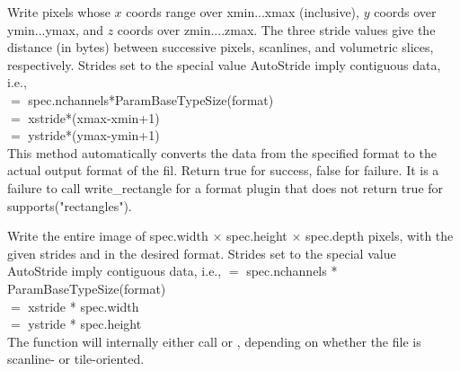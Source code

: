 \apiend


Write pixels whose $x$ coords range over {\kw xmin}...{\kw xmax} (inclusive), $y$
coords over {\kw ymin}...{\kw ymax}, and $z$ coords over {\kw
  zmin}....{\kw zmax}.  The
three stride values give the distance (in bytes) between
successive pixels, scanlines, and volumetric slices,
respectively.  Strides set to the special value {\kw AutoStride}
imply contiguous data, i.e.,\\
 $=$ {\kw spec.nchannels*ParamBaseTypeSize(format)} \\
 $=$ {\kw xstride*(xmax-xmin+1)} \\
 $=$ {\kw ystride*(ymax-ymin+1)}\\
This method automatically converts the data from the specified 
{\kw format} to the actual output format of the fil.  Return {\kw true}
for success, {\kw false} for failure.  It is a failure to call 
{\kw write_rectangle} for a format plugin that does not return true for
{\kw supports("rectangles")}.

\apiend


Write the entire image of {\kw spec.width} $\times$ {\kw spec.height}
$\times$ {\kw spec.depth}
pixels, with the given strides and in the desired format.
Strides set to the special value {\kw AutoStride} imply contiguous data, i.e.,
 $=$ {\kw spec.nchannels * ParamBaseTypeSize(format)} \\
 $=$ {\kw xstride * spec.width} \\
 $=$ {\kw ystride * spec.height}\\
The function will internally either call \writescanline or 
\writetile, depending on whether the file is scanline- or
tile-oriented.

